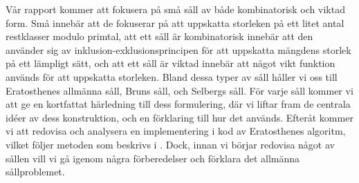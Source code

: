 Vår rapport kommer att fokusera på små såll av både kombinatorisk och viktad form. 
Små innebär att de fokuserar på att uppskatta storleken på ett litet antal restklasser modulo primtal, att ett såll är kombinatorisk innebär att den använder sig av inklusion-exklusionsprincipen för att uppskatta mängdens storlek på ett lämpligt sätt, och att ett såll är viktad innebär att något vikt funktion används för att uppskatta storleken. 
Bland dessa typer av såll håller vi oss till Eratosthenes allmänna såll, Bruns såll, och Selbergs såll. 
För varje såll kommer vi att ge en kortfattat härledning till dess formulering, där vi liftar fram de centrala idéer av dess konstruktion, och en förklaring till hur det används. 
Efteråt kommer vi att redovisa och analysera en implementering i kod av Eratosthenes algoritm, vilket följer metoden som beskrivs i \cite{HaraldSieve}. 
Dock, innan vi börjar redovisa något av sållen vill vi gå igenom några förberedelser och förklara det allmänna sållproblemet.